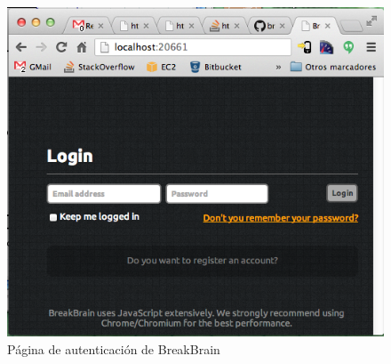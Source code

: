 \begin{enumerate}
\begin{figure}[h]
  \begin{center}
    \includegraphics[width=\textwidth]{images/breakbrain-login.png}
    \caption{Página de autenticación de BreakBrain}
    \label{fig::login}
  \end{center}
\end{figure}

\end{enumerate}
